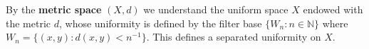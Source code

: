By the \textbf{metric space} $(X, d)$ we understand the uniform space $X$ endowed with the metric $d$, whose uniformity is defined by the filter base $\{W_n : n \in \mathbb{N}\}$ where $W_n = \{(x, y) : d(x, y) < n^{-1}\}$. This defines a separated uniformity on $X$.
